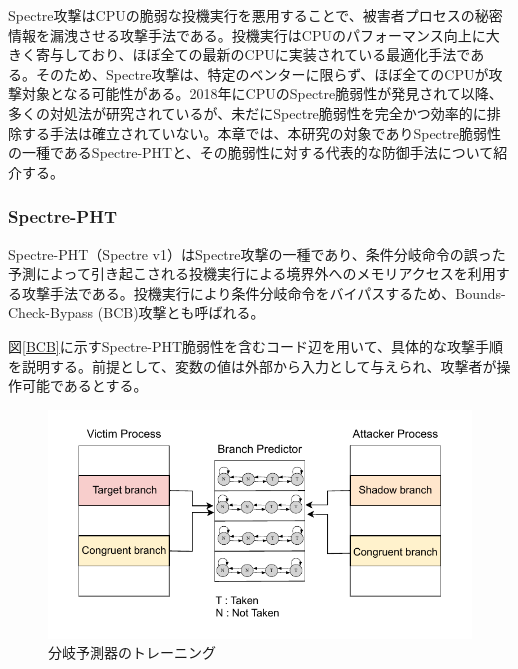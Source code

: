 Spectre攻撃\cite{8835233,Spectre-v4,220586,10.1145/3243734.3243761}はCPUの脆弱な投機実行を悪用することで、被害者プロセスの秘密情報を漏洩させる攻撃手法である。投機実行はCPUのパフォーマンス向上に大きく寄与しており、ほぼ全ての最新のCPUに実装されている最適化手法である。そのため、Spectre攻撃は、特定のベンターに限らず、ほぼ全てのCPUが攻撃対象となる可能性がある。2018年にCPUのSpectre脆弱性が発見されて以降、多くの対処法が研究されているが、未だにSpectre脆弱性を完全かつ効率的に排除する手法は確立されていない。本章では、本研究の対象でありSpectre脆弱性の一種であるSpectre-PHT\cite{8835233}と、その脆弱性に対する代表的な防御手法について紹介する。

\subsubsection{Spectre-PHT}
Spectre-PHT（Spectre v1）\cite{8835233}はSpectre攻撃の一種であり、条件分岐命令の誤った予測によって引き起こされる投機実行による境界外へのメモリアクセスを利用する攻撃手法である。投機実行により条件分岐命令をバイパスするため、Bounds-Check-Bypass (BCB)攻撃とも呼ばれる。\par

図\ref{BCB}に示すSpectre-PHT脆弱性を含むコード辺を用いて、具体的な攻撃手順を説明する。前提として、変数の値は外部から入力として与えられ、攻撃者が操作可能であるとする。\par

\begin{figure}[tb]
  \centering
  \includegraphics[width=\linewidth]{img/branch_predicator.drawio.pdf}
  \caption{分岐予測器のトレーニング}
  \label{fig:branch_predicator}
\end{figure}


